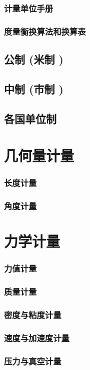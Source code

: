 \documentclass[UTF8]{../../ApplicationUniverse}
\begin{document}
        \subsubsection{计量单位手册}
        \subsubsection{度量衡换算法和换算表}
    \subsection{公制 (米制 )}
    \subsection{中制 (市制 )}
    \subsection{各国单位制}
\section{几何量计量}
    \subsubsection{长度计量}
    \subsubsection{角度计量}
\section{力学计量}
    \subsubsection{力值计量}
    \subsubsection{质量计量}
    \subsubsection{密度与粘度计量}
    \subsubsection{速度与加速度计量}
    \subsubsection{压力与真空计量}
\end{document}
